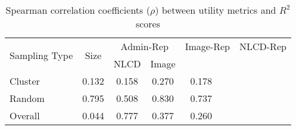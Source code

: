 \begin{table}[htbp]
\centering
\begin{tabular}{lcccc}
\toprule
\multirow{2}{*}{Sampling Type} & \multirow{2}{*}{Size} & \multicolumn{2}{c}{Admin-Rep} & \multicolumn{2}{c}{Image-Rep} & \multicolumn{2}{c}{NLCD-Rep}  \\
\cmidrule(lr){3-4}
 & & NLCD & Image & \\
\midrule
Cluster & 0.132 & 0.158 & 0.270 & 0.178 \\
Random & 0.795 & 0.508 & 0.830 & 0.737 \\
\midrule
Overall & 0.044 & 0.777 & 0.377 & 0.260 \\
\bottomrule
\end{tabular}
\caption{Spearman correlation coefficients ($\rho$) between utility metrics and $R^2$ scores}
\label{tab:rho_values}
\end{table}